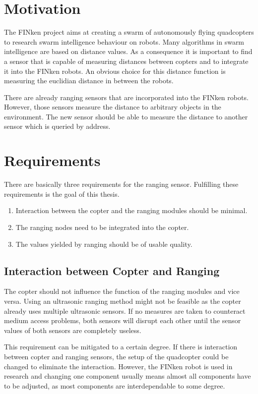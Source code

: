 \section{Motivation}

The FINken project aims at creating a swarm of autonomously flying quadcopters to research swarm intelligence behaviour on robots.
Many algorithms in swarm intelligence are based on distance values.
As a consequence it is important to find a sensor that is capable of measuring distances between copters and to integrate it into the FINken robots.
An obvious choice for this distance function is measuring the euclidian distance in between the robots.

There are already ranging sensors that are incorporated into the FINken robots.
However, those sensors measure the distance to arbitrary objects in the environment.
The new sensor should be able to measure the distance to another sensor which is queried by address.

\section{Requirements}
\label{req}
There are basically three requirements for the ranging sensor.
Fulfilling these requirements is the goal of this thesis.

\begin{enumerate}
	\item Interaction between the copter and the ranging modules should be minimal.
	\item The ranging nodes need to be integrated into the copter.
	\item The values yielded by ranging should be of usable quality.
\end{enumerate}

\subsection{Interaction between Copter and Ranging}
\label{req1}
The copter should not influence the function of the ranging modules and vice versa.
Using an ultrasonic ranging method might not be feasible as the copter already uses multiple ultrasonic sensors.
If no measures are taken to counteract medium access problems, both sensors will disrupt each other until the sensor values of both sensors are completely useless.

This requirement can be mitigated to a certain degree.
If there is interaction between copter and ranging sensors, the setup of the quadcopter could be changed to eliminate the interaction.
However, the FINken robot is used in research and changing one component usually means almost all components have to be adjusted, as most components are interdependable to some degree.

